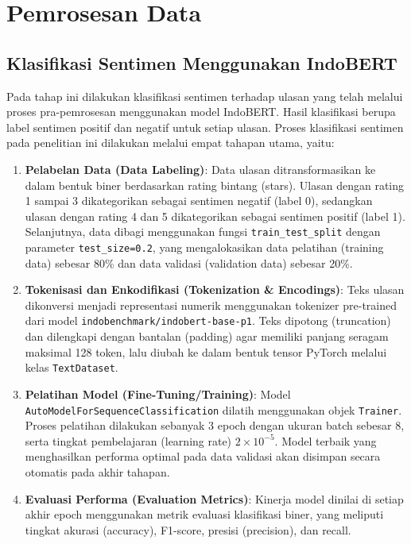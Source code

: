 \section{Pemrosesan Data}

\subsection{Klasifikasi Sentimen Menggunakan IndoBERT}

Pada tahap ini dilakukan klasifikasi sentimen terhadap ulasan yang telah melalui proses pra-pemrosesan menggunakan model IndoBERT. Hasil klasifikasi berupa label sentimen positif dan negatif untuk setiap ulasan. Proses klasifikasi sentimen pada penelitian ini dilakukan melalui empat tahapan utama, yaitu:

\begin{enumerate}
    \item \textbf{Pelabelan Data (Data Labeling)}: Data ulasan ditransformasikan ke dalam bentuk biner berdasarkan rating bintang (stars). Ulasan dengan rating 1 sampai 3 dikategorikan sebagai sentimen negatif (label 0), sedangkan ulasan dengan rating 4 dan 5 dikategorikan sebagai sentimen positif (label 1). Selanjutnya, data dibagi menggunakan fungsi \texttt{train\_test\_split} dengan parameter \texttt{test\_size=0.2}, yang mengalokasikan data pelatihan (training data) sebesar 80\% dan data validasi (validation data) sebesar 20\%.
    
    \item \textbf{Tokenisasi dan Enkodifikasi (Tokenization \& Encodings)}: Teks ulasan dikonversi menjadi representasi numerik menggunakan tokenizer pre-trained dari model \texttt{indobenchmark/}\allowbreak\texttt{indobert-base-p1}. Teks dipotong (truncation) dan dilengkapi dengan bantalan (padding) agar memiliki panjang seragam maksimal 128 token, lalu diubah ke dalam bentuk tensor PyTorch melalui kelas \texttt{TextDataset}.
    
    \item \textbf{Pelatihan Model (Fine-Tuning/Training)}: Model \texttt{AutoModelForSequenceClassification} dilatih menggunakan objek \texttt{Trainer}. Proses pelatihan dilakukan sebanyak 3 epoch dengan ukuran batch sebesar 8, serta tingkat pembelajaran (learning rate) $2 \times 10^{-5}$. Model terbaik yang menghasilkan performa optimal pada data validasi akan disimpan secara otomatis pada akhir tahapan.
    
    \item \textbf{Evaluasi Performa (Evaluation Metrics)}: Kinerja model dinilai di setiap akhir epoch menggunakan metrik evaluasi klasifikasi biner, yang meliputi tingkat akurasi (accuracy), F1-score, presisi (precision), dan recall.
\end{enumerate}

